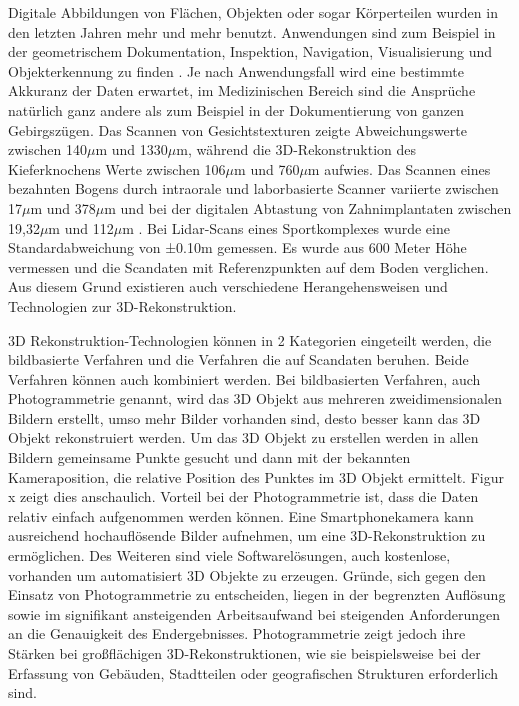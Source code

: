 Digitale Abbildungen von Flächen, Objekten oder sogar Körperteilen wurden in den
letzten Jahren mehr und mehr benutzt. Anwendungen sind zum Beispiel in der
geometrischem Dokumentation, Inspektion, Navigation, Visualisierung und 
Objekterkennung zu finden \cite{Verykokou.2023}. Je nach Anwendungsfall wird eine
bestimmte Akkuranz
der Daten erwartet, im Medizinischen Bereich sind die Ansprüche natürlich ganz 
andere als zum Beispiel in der Dokumentierung von ganzen Gebirgszügen.
Das Scannen von Gesichtstexturen zeigte Abweichungswerte zwischen 140$\mu$m und 
1330$\mu$m, während die 3D-Rekonstruktion des Kieferknochens Werte zwischen 106$\mu$m 
und 760$\mu$m aufwies. 
Das Scannen eines bezahnten Bogens durch intraorale und laborbasierte
Scanner variierte zwischen 17$\mu$m und 378$\mu$m und bei der 
digitalen Abtastung von Zahnimplantaten zwischen 19,32$\mu$m
und 112$\mu$m \cite{Bohner.2019}.
Bei Lidar-Scans eines Sportkomplexes wurde eine Standardabweichung von ±0.10m 
gemessen. Es wurde aus 600 Meter Höhe vermessen und die Scandaten mit 
Referenzpunkten auf dem Boden verglichen. \cite{Elaksher.2023}
Aus diesem Grund existieren auch verschiedene Herangehensweisen und Technologien  
zur 3D-Rekonstruktion.

3D Rekonstruktion-Technologien können in 2 Kategorien eingeteilt werden,
die bildbasierte Verfahren und die Verfahren die auf Scandaten 
beruhen. \cite{Verykokou.2023}
Beide Verfahren können auch kombiniert werden. 
Bei bildbasierten Verfahren, auch Photogrammetrie genannt, wird das 3D Objekt aus
mehreren zweidimensionalen Bildern erstellt, 
umso mehr Bilder vorhanden sind, desto besser kann das
3D Objekt rekonstruiert werden. Um das 3D Objekt zu erstellen werden in 
allen Bildern gemeinsame Punkte gesucht und dann mit der bekannten Kameraposition, 
die relative Position des Punktes im 3D Objekt ermittelt. Figur x zeigt dies 
anschaulich.
Vorteil bei der Photogrammetrie ist, dass die Daten relativ einfach aufgenommen werden
können. Eine Smartphonekamera kann ausreichend hochauflösende Bilder aufnehmen, um 
eine 3D-Rekonstruktion zu ermöglichen. Des Weiteren sind viele Softwarelösungen,
auch kostenlose, vorhanden um automatisiert 3D Objekte zu erzeugen.
Gründe, sich gegen den Einsatz von Photogrammetrie zu entscheiden, 
liegen in der begrenzten Auflösung sowie im signifikant ansteigenden Arbeitsaufwand 
bei steigenden Anforderungen an die Genauigkeit des Endergebnisses. 
Photogrammetrie zeigt jedoch ihre Stärken bei großflächigen 3D-Rekonstruktionen, 
wie sie beispielsweise bei der Erfassung von Gebäuden, Stadtteilen oder geografischen 
Strukturen erforderlich sind.

